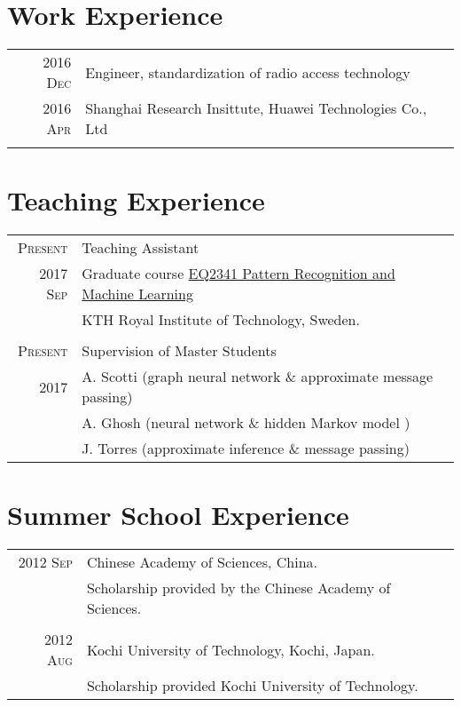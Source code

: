 \documentclass[a4paper,10pt]{article}
\begin{document}
\section{Work Experience}

\begin{tabular}{r|p{13cm}}

  \textsc{2016 Dec}  & Engineer, standardization of radio access technology  \\
  \textsc{2016 Apr}  & Shanghai Research Insittute, Huawei Technologies Co., Ltd \\
  \multicolumn{2}{c}{} \\

\end{tabular}

\section{Teaching Experience}
\begin{tabular}{r|p{13cm}}

  \textsc{Present}  & Teaching Assistant \\
  \textsc{2017 Sep}  & Graduate course \href{https://www.kth.se/student/kurser/kurs/EQ2341?l=en}{EQ2341 Pattern Recognition and Machine Learning} \\
                    & KTH Royal Institute of Technology, Sweden.\\

\multicolumn{2}{c}{} \\

  \textsc{Present}  & Supervision of Master Students \\
  \textsc{2017 }  & A. Scotti (graph neural network \& approximate message passing) \\
                    & A. Ghosh (neural network \& hidden Markov model ) \\
                    & J. Torres (approximate inference \& message passing)\\


\end{tabular}

\section{Summer School Experience}
\begin{tabular}{r|p{13cm}}

  \textsc{2012 Sep}  & Chinese Academy of Sciences, China. \\
                     & Scholarship provided by the Chinese Academy of Sciences. \\
  \multicolumn{2}{c}{}\\
  \textsc{2012 Aug}  & Kochi University of Technology, Kochi, Japan. \\
                     & Scholarship provided Kochi University of Technology.
\end{tabular}
\end{document}
